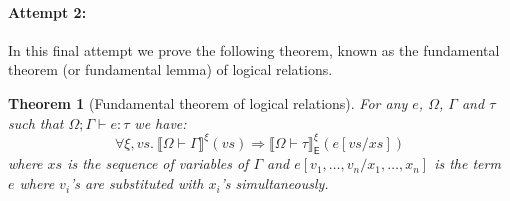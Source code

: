 \documentclass{article}
\newtheorem{theorem}{Theorem}
\newcommand{\EXP}{\mathsf{E}}
\newcommand{\semtyp}[2]{\llbracket #2 \rrbracket_{#1}}
\begin{document}
\paragraph{Attempt 2:} In this final attempt we prove the following theorem, known as the fundamental theorem (or fundamental lemma) of logical relations.

\begin{theorem}[Fundamental theorem of logical relations]
For any $e$, $\Omega$, $\Gamma$ and $\tau$ such that $\Omega; \Gamma \vdash e : \tau$ we have:
\[
\forall \xi, \mathit{vs}. ~\semtyp{}{\Omega \vdash \Gamma}^{\xi}(\mathit{vs}) \Rightarrow
\semtyp{\EXP}{\Omega \vdash \tau}^{\xi}(e[\mathit{vs}/\mathit{xs}])
\]
where $\mathit{xs}$ is the sequence of variables of $\Gamma$ and
$e[v_1, \dots, v_n/x_1, \dots, x_n]$ is the term $e$ where $v_i$'s are substituted with $x_i$'s simultaneously.
\end{theorem}
\end{document}

